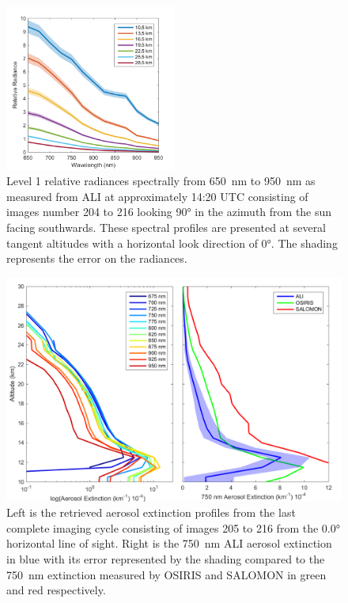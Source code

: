 \documentclass[12pt]{article}
\begin{document}
\clearpage

\begin{figure}
\includegraphics[width=0.5\textwidth]{./Images/5-2-AliSpectralRadiances.pdf}
    \caption{Level 1 relative radiances spectrally from 650~nm to 950~nm as measured from ALI at approximately 14:20 UTC consisting of images number 204 to 216 looking 
90\si{\degree} in the azimuth from the sun facing southwards. These spectral profiles are presented at several tangent altitudes with a horizontal look direction of 
0\si{\degree}. The shading represents the error on the radiances. }
    \label{fig:AliSpectralRadiances}
\end{figure}

\clearpage

\begin{figure}
\includegraphics[width=1.0\textwidth]{./Images/5-3-FullAerosolCycleComparison.pdf}
    \caption{Left is the retrieved aerosol extinction profiles from the last complete imaging cycle consisting of images 205 to 216 from the 0.0\si{\degree} horizontal line of 
sight. Right is the 750~nm ALI aerosol extinction in blue with its error represented by the shading compared to the 750~nm extinction measured by OSIRIS and SALOMON in green 
and red respectively.}
    \label{fig:AliAerosolCycle}
\end{figure}
\end{document}
